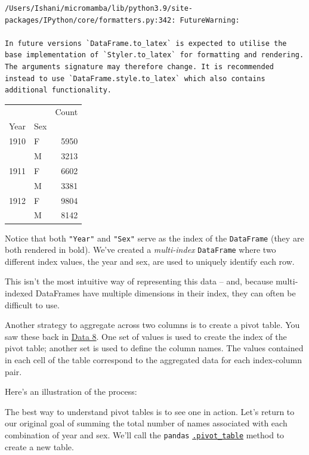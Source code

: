 \documentclass[
  letterpaper,
  DIV=11,
  numbers=noendperiod]{scrreprt}
\begin{document}
\begin{verbatim}
/Users/Ishani/micromamba/lib/python3.9/site-packages/IPython/core/formatters.py:342: FutureWarning:

In future versions `DataFrame.to_latex` is expected to utilise the base implementation of `Styler.to_latex` for formatting and rendering. The arguments signature may therefore change. It is recommended instead to use `DataFrame.style.to_latex` which also contains additional functionality.
\end{verbatim}

\begin{tabular}{llr}
\toprule
     &   &  Count \\
Year & Sex &        \\
\midrule
1910 & F &   5950 \\
     & M &   3213 \\
1911 & F &   6602 \\
     & M &   3381 \\
1912 & F &   9804 \\
     & M &   8142 \\
\bottomrule
\end{tabular}

Notice that both \texttt{"Year"} and \texttt{"Sex"} serve as the index
of the \texttt{DataFrame} (they are both rendered in bold). We've
created a \emph{multi-index} \texttt{DataFrame} where two different
index values, the year and sex, are used to uniquely identify each row.

This isn't the most intuitive way of representing this data -- and,
because multi-indexed DataFrames have multiple dimensions in their
index, they can often be difficult to use.

Another strategy to aggregate across two columns is to create a pivot
table. You saw these back in
\href{https://inferentialthinking.com/chapters/08/3/Cross-Classifying_by_More_than_One_Variable.html\#pivot-tables-rearranging-the-output-of-group}{Data
8}. One set of values is used to create the index of the pivot table;
another set is used to define the column names. The values contained in
each cell of the table correspond to the aggregated data for each
index-column pair.

Here's an illustration of the process:

The best way to understand pivot tables is to see one in action. Let's
return to our original goal of summing the total number of names
associated with each combination of year and sex. We'll call the
\texttt{pandas}
\href{https://pandas.pydata.org/pandas-docs/stable/reference/api/pandas.pivot_table.html}{\texttt{.pivot\_table}}
method to create a new table.
\end{document}
